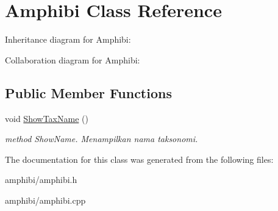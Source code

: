 \hypertarget{classAmphibi}{}\section{Amphibi Class Reference}
\label{classAmphibi}


Inheritance diagram for Amphibi\+:


Collaboration diagram for Amphibi\+:
\subsection*{Public Member Functions}
\begin{DoxyCompactItemize}
\item 
void \hyperlink{classAmphibi_a0d47ff47fda944cdbae926c41d16adc3}{Show\+Tax\+Name} ()\hypertarget{classAmphibi_a0d47ff47fda944cdbae926c41d16adc3}{}\label{classAmphibi_a0d47ff47fda944cdbae926c41d16adc3}

\begin{DoxyCompactList}\small\item\em method Show\+Name. Menampilkan nama taksonomi. \end{DoxyCompactList}\end{DoxyCompactItemize}


The documentation for this class was generated from the following files\+:\begin{DoxyCompactItemize}
\item 
amphibi/amphibi.\+h\item 
amphibi/amphibi.\+cpp\end{DoxyCompactItemize}
